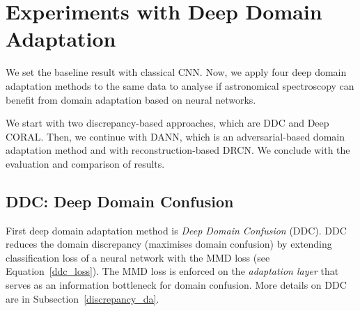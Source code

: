\begin{table}
\begin{center}
\end{center}
\caption[Confusion matrices of the baseline model]{
	Confusion matrices of the baseline model for the source and target validation sets.
	We see the enormous error on the target domain
	where the model predicts 937 non-QSOs as QSOs and cannot identify 44 QSOs.
}
\end{table}

\section{Experiments with Deep Domain Adaptation}

We set the baseline result with classical CNN.
Now, we apply four deep domain adaptation methods to the same data
to analyse if astronomical spectroscopy can benefit from domain adaptation
based on neural networks.

We start with two discrepancy-based approaches, which are DDC and Deep CORAL.
Then, we continue with DANN, which is an adversarial-based domain adaptation method
and with reconstruction-based DRCN.
We conclude with the evaluation and comparison of results.

\subsection{DDC: Deep Domain Confusion}

First deep domain adaptation method is \textit{Deep Domain Confusion} (DDC).
DDC reduces the domain discrepancy (maximises domain confusion)
by extending classification loss of a neural network with the MMD loss
(see Equation~\ref{ddc_loss}).
The MMD loss is enforced on the \textit{adaptation layer}
that serves as an information bottleneck for domain confusion.
More details on DDC are in Subsection~\ref{discrepancy_da}.

